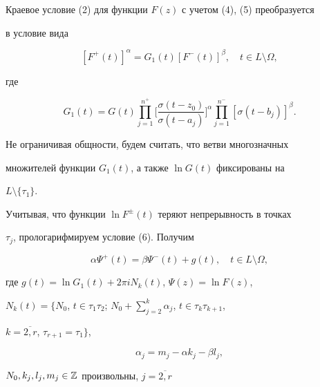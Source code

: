 Краевое условие (2) для функции $F(z)$ с учетом (4), (5) преобразуется


в условие вида


\begin{equation}


[F^{+}(t)]^{\alpha} =


G_{1}(t)[F^{-}(t)]^{\beta},\quad t\in L\setminus \Omega,


\end{equation}


где


$$


G_{1}(t) = G(t)\prod_{j=1}^{n^+}\bigg[


\frac{\sigma (t-z_0)}{\sigma(t-a_j)}\bigg]^{\alpha}


\prod_{j=1}^{n^-}[\sigma (t-b_j)]^{\beta}.


$$





Не ограничивая общности, будем считать, что ветви многозначных


множителей функции $G_{1}(t)$, а также $\ln G(t)$ фиксированы на


$L\setminus \{\tau_1 \}$.





Учитывая, что функции $\ln F^{\pm}(t)$ теряют непрерывность в точках


$\tau_j$, прологарифмируем условие (6). Получим


\begin{equation}


\alpha \Psi^{+}(t) = \beta \Psi^{-}(t) + g(t),\quad


t\in L\setminus\Omega,


\end{equation}


где $g(t)=\ln G_{1}(t) + 2\pi iN_{k}(t)$, $\Psi(z)=\ln F(z)$,


$N_{k}(t)=\Big\{N_{0}$, $t\in\tau_{1}\tau_{2}$; $N_{0}+


\sum\limits_{j=2}^{k}\alpha_{j}$, $t\in \tau_{k}\tau_{k+1}$,


$k=\overline{2,r}$, $\tau_{r+1}=\tau_1\Big\}$,


\begin{equation}


\alpha_{j}=m_j-\alpha k_j -\beta l_j,


\end{equation}


$N_0,k_j,l_j,m_j\in\Bbb Z$ произвольны, $j=\overline{2,r}$


